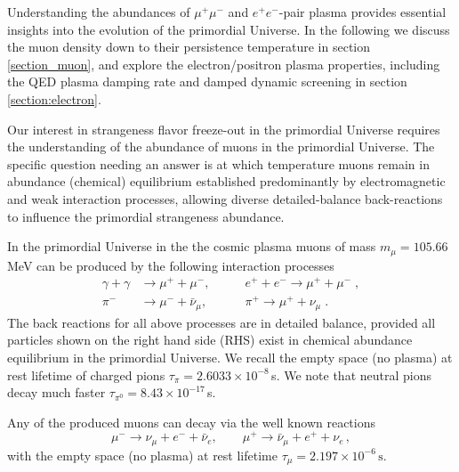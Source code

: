 Understanding the abundances of $\mu^+\mu^-$ and $e^+e^-$-pair plasma provides essential insights into the evolution of the primordial Universe. In the following we discuss the muon density down to their persistence temperature in section \ref{section_muon}, and explore the electron/positron plasma properties, including the QED plasma damping rate and damped dynamic screening in section \ref{section:electron}.

\label{section_muon}
Our interest in strangeness flavor freeze-out in the primordial Universe requires the understanding of the abundance of muons in the primordial Universe. The specific question needing an answer is at which temperature muons remain in abundance (chemical) equilibrium established predominantly by electromagnetic and weak interaction processes, allowing diverse detailed-balance back-reactions to influence the primordial strangeness abundance.

In the primordial Universe in the the cosmic plasma muons of mass $m_\mu=105.66$\,MeV can be produced by the following interaction processes~\cite{Yang:2024ret,Rafelski:2021aey}
\begin{align} 
\gamma+\gamma&\longrightarrow\mu^++\mu^-,\qquad &e^++e^-\longrightarrow \mu^++\mu^-\;,\\
\pi^-&\longrightarrow\mu^-+\bar{\nu}_\mu,\qquad &\pi^+ \longrightarrow\mu^++\nu_\mu\;.
\end{align}
The back reactions for all above processes are in detailed balance, provided all particles shown on the right hand side (RHS) exist in chemical abundance equilibrium in the primordial Universe. We recall the empty space (no plasma) at rest lifetime of charged pions $\tau_\pi=2.6033\times 10^{-8}$\,s. We note that neutral pions decay much faster $\tau_{\pi^0}=8.43\times 10^{-17}$\,s.

Any of the produced muons can decay via the well known reactions
\begin{equation}
\mu^-\rightarrow\nu_\mu+e^-+\bar{\nu}_e,\qquad \mu^+\rightarrow\bar{\nu}_\mu+e^++\nu_e\,,
\end{equation} 
with the empty space (no plasma) at rest lifetime $\tau_{\mu}=2.197 \times 10^{-6}\,\mathrm{s}$. 
 
